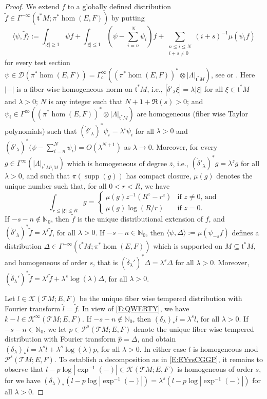 \documentclass[reqno,12pt]{amsart}
\DeclareMathOperator{\supp}{supp}
\theoremstyle{plain}
\theoremstyle{definition}
\begin{document}
\begin{proof}
We extend $f$ to a globally defined distribution $\tilde f\in\Gamma^{-\infty}(\mathfrak t^*M;\pi^*\hom(E,F))$ by putting
$$
\langle\psi,\tilde f\rangle
:=\int_{|\xi|\geq1}\psi f
+\int_{|\xi|\leq1}\left(\psi-\sum_{i=n}^N\psi_i\right)f
+\sum_{\substack{n\leq i\leq N\\i+s\neq0}}(i+s)^{-1}\mu(\psi_if)
$$
for every test section $\psi\in\mathcal D(\pi^*\hom(E,F))=\Gamma^\infty_c((\pi^*\hom(E,F))^*\otimes|\Lambda|_{\mathfrak t^*M})$, see \cite[Section~3]{CGGP92} or \cite[Proof of Proposition~6.15]{FS74}.
Here $|-|$ is a fiber wise homogeneous norm on $\mathfrak t^*M$, i.e., $|\dot\delta'_\lambda\xi|=\lambda|\xi|$ for all $\xi\in\mathfrak t^*M$ and $\lambda>0$;
$N$ is any integer such that $N+1+\Re(s)>0$;
and $\psi_i\in\Gamma^\infty((\pi^*\hom(E,F))^*\otimes|\Lambda|_{\mathfrak t^*M})$ are homogeneous (fiber wise Taylor polynomials) such that $(\dot\delta'_\lambda)^*\psi_i=\lambda^i\psi_i$ for all $\lambda>0$ and $(\dot\delta'_\lambda)^*\bigl(\psi-\sum_{i=n}^N\psi_i\bigr)=O(\lambda^{N+1})$ as $\lambda\to0$.
Moreover, for every $g\in\Gamma^\infty(|\Lambda|_{\mathfrak t^*M\setminus M})$ which is homogeneous of degree $z$, i.e., $(\dot\delta'_\lambda)^*g=\lambda^zg$ for all $\lambda>0$, and such that $\pi(\supp(g))$ has compact closure, $\mu(g)$ denotes the unique number such that, for all $0<r<R$, we have
$$
\int_{r\leq|\xi|\leq R}g
=\begin{cases}\mu(g)z^{-1}(R^z-r^z)&\textrm{if $z\neq0$, and}\\\mu(g)\log(R/r)&\textrm{if $z=0$.}\end{cases}
$$ 
If $-s-n\notin\mathbb N_0$, then $\tilde f$ is the unique distributional extension of $f$, and $(\dot\delta'_\lambda)^*\tilde f=\lambda^s\tilde f$, for all $\lambda>0$.
If $-s-n\in\mathbb N_0$, then $\langle\psi,\Delta\rangle:=\mu(\psi_{-s}f)$ defines a distribution $\Delta\in\Gamma^{-\infty}(\mathfrak t^*M;\pi^*\hom(E,F))$ which is supported on $M\subseteq\mathfrak t^*M$, and homogeneous of order $s$, that is $(\dot\delta_\lambda')^*\Delta=\lambda^s\Delta$ for all $\lambda>0$.
Moreover, $(\dot\delta_\lambda')^*\tilde f=\lambda^s\tilde f+\lambda^s\log(\lambda)\Delta$, for all $\lambda>0$.


Let $l\in\mathcal K(\mathcal TM;E,F)$ be the unique fiber wise tempered distribution with Fourier transform $\hat l=\tilde f$.
In view of \eqref{E:QWERTY}, we have $k-l\in\mathcal K^\infty(\mathcal TM;E,F)$.
If $-s-n\notin\mathbb N_0$, then $(\delta_\lambda)_*l=\lambda^sl$, for all $\lambda>0$.
If $-s-n\in\mathbb N_0$, we let $p\in\mathcal P^s(\mathcal TM;E,F)$ denote the unique fiber wise tempered distribution with Fourier transform $\hat p=\Delta$, and obtain $(\delta_\lambda)_*l=\lambda^sl+\lambda^s\log(\lambda)p$, for all $\lambda>0$.
In either case $l$ is homogeneous mod $\mathcal P^s(\mathcal TM;E,F)$.
To establish a decomposition as in \eqref{E:EYvsCGGP}, it remains to observe that $l-p\log|\exp^{-1}(-)|\in\mathcal K(\mathcal TM;E,F)$ is homogeneous of order $s$, for we have $(\delta_\lambda)_*(l-p\log|\exp^{-1}(-)|)=\lambda^s(l-p\log|\exp^{-1}(-)|)$ for all $\lambda>0$.



\end{proof}
\end{document}
